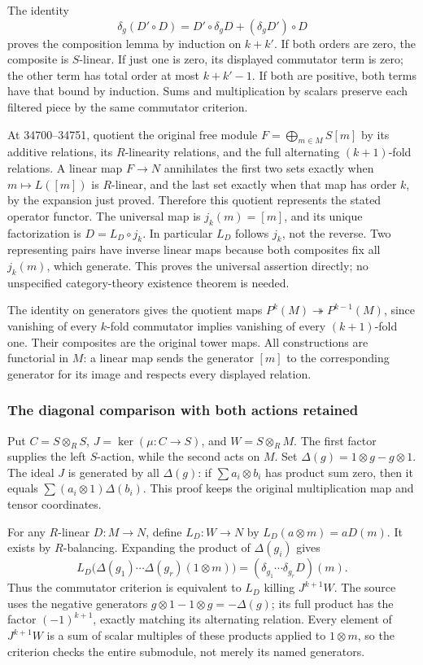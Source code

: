 The identity \[
\delta_g(D'\circ D)=D'\circ\delta_gD+(\delta_gD')\circ D
\] proves the composition lemma by induction on \(k+k'\). If both orders are zero, the composite is \(S\)-linear. If just one is zero, its displayed commutator term is zero; the other term has total order at most \(k+k'-1\). If both are positive, both terms have that bound by induction. Sums and multiplication by scalars preserve each filtered piece by the same commutator criterion.

At 34700--34751, quotient the original free module \(F=\bigoplus_{m\in M}S[m]\) by its additive relations, its \(R\)-linearity relations, and the full alternating \((k+1)\)-fold relations. A linear map \(F\to N\) annihilates the first two sets exactly when \(m\mapsto L([m])\) is \(R\)-linear, and the last set exactly when that map has order \(k\), by the expansion just proved. Therefore this quotient represents the stated operator functor. The universal map is \(j_k(m)=[m]\), and its unique factorization is \(D=L_D\circ j_k\). In particular \(L_D\) follows \(j_k\), not the reverse. Two representing pairs have inverse linear maps because both composites fix all \(j_k(m)\), which generate. This proves the universal assertion directly; no unspecified category-theory existence theorem is needed.

The identity on generators gives the quotient maps \(P^k(M)\twoheadrightarrow P^{k-1}(M)\), since vanishing of every \(k\)-fold commutator implies vanishing of every \((k+1)\)-fold one. Their composites are the original tower maps. All constructions are functorial in \(M\): a linear map sends the generator \([m]\) to the corresponding generator for its image and respects every displayed relation.

\subsubsection{The diagonal comparison with both actions retained}\label{algebra-proof-043-the-diagonal-comparison-with-both-actions-retained}

Put \(C=S\otimes_R S\), \(J=\ker(\mu:C\to S)\), and \(W=S\otimes_R M\). The first factor supplies the left \(S\)-action, while the second acts on \(M\). Set \(\Delta(g)=1\otimes g-g\otimes1\). The ideal \(J\) is generated by all \(\Delta(g)\): if \(\sum a_i\otimes b_i\) has product sum zero, then it equals \(\sum(a_i\otimes1)\Delta(b_i)\). This proof keeps the original multiplication map and tensor coordinates.

For any \(R\)-linear \(D:M\to N\), define \(L_D:W\to N\) by \(L_D(a\otimes m)=aD(m)\). It exists by \(R\)-balancing. Expanding the product of \(\Delta(g_i)\) gives \[
L_D\bigl(\Delta(g_1)\cdots\Delta(g_r)(1\otimes m)\bigr)
=(\delta_{g_1}\cdots\delta_{g_r}D)(m).
\] Thus the commutator criterion is equivalent to \(L_D\) killing \(J^{k+1}W\). The source uses the negative generators \(g\otimes1-1\otimes g=-\Delta(g)\); its full product has the factor \((-1)^{k+1}\), exactly matching its alternating relation. Every element of \(J^{k+1}W\) is a sum of scalar multiples of these products applied to \(1\otimes m\), so the criterion checks the entire submodule, not merely its named generators.

